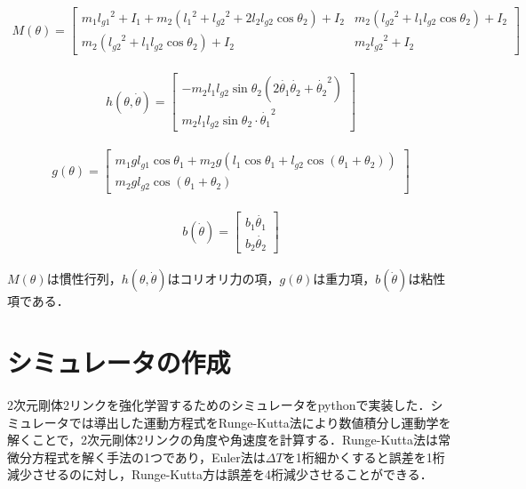 \begin{align}
  M(\theta)= 
            \begin{bmatrix}
              m_{1}{l_{g1}}^2 + I_{1} + m_{2}({l_{1}}^2 + {l_{g2}}^2 + 2l_{2}l_{g2}\cos\theta_{2}) + I_{2} & m_{2}({l_{g2}}^2 + l_{1}l_{g2}\cos\theta_{2}) + I_{2} \\
              m_{2}({l_{g2}}^2 + l_{1}l_{g2}\cos\theta_{2}) + I_{2} & m_{2}{l_{g2}}^2 + I_{2}
            \end{bmatrix}
\end{align}

\begin{eqnarray}
  h(\theta, \dot{\theta})=
            \begin{bmatrix}
              -m_{2}l_{1}l_{g2}\sin\theta_{2}(2\dot{\theta_{1}}\dot{\theta_{2}} + {\dot{\theta_{2}}}^2) \\
              m_{2}l_{1}l_{g2}\sin\theta_{2}\cdot{\dot{\theta_{1}}}^2
            \end{bmatrix}
\end{eqnarray}

\begin{eqnarray}
  g(\theta)=
            \begin{bmatrix}
              m_{1}gl_{g1}\cos\theta_{1} + m_{2}g(l_{1}\cos\theta_{1} + l_{g2}\cos(\theta_{1} + \theta_{2})) \\
              m_{2}gl_{g2}\cos(\theta_{1} + \theta_{2})
            \end{bmatrix}
\end{eqnarray}

\begin{eqnarray}
  b(\dot{\theta})=
            \begin{bmatrix}
              b_{1}\dot{\theta_{1}} \\
              b_{2}\dot{\theta_{2}}
            \end{bmatrix}
\end{eqnarray}

$M(\theta)$は慣性行列，$h(\theta, \dot{\theta})$はコリオリ力の項，$g(\theta)$は重力項，$b(\dot{\theta})$は粘性項である．

\section{シミュレータの作成}
2次元剛体2リンクを強化学習するためのシミュレータをpythonで実装した．シミュレータでは導出した運動方程式をRunge-Kutta法\cite{runge-kutta}により数値積分し運動学を解くことで，2次元剛体2リンクの角度や角速度を計算する．Runge-Kutta法は常微分方程式を解く手法の1つであり，Euler法は$\Delta T$を1桁細かくすると誤差を1桁減少させるのに対し，Runge-Kutta方は誤差を4桁減少させることができる．
